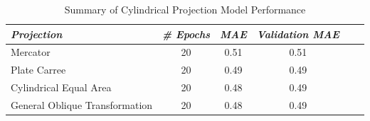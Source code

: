 \begin{table}[ht]
    \centering
    \caption{Summary of Cylindrical Projection Model Performance}
    \label{cylindrical_results_table}
    \renewcommand{\arraystretch}{1.2} %
    \begin{tabular}{|l|c|c|c|c|c|}
        \hline
        \rowcolor[gray]{0.9}
        \textbf{\emph{Projection}}     & \textbf{\emph{\# Epochs}} & \textbf{\emph{MAE}} & \textbf{\emph{Validation MAE}} \\ \hline
        Mercator                       & 20                        & 0.51                & 0.51                           \\ \hline
        Plate Carree                   & 20                        & 0.49                & 0.49                           \\ \hline
        Cylindrical Equal Area         & 20                        & 0.48                & 0.49                           \\ \hline
        General Oblique Transformation & 20                        & 0.48                & 0.49                           \\ \hline
    \end{tabular}
\end{table}